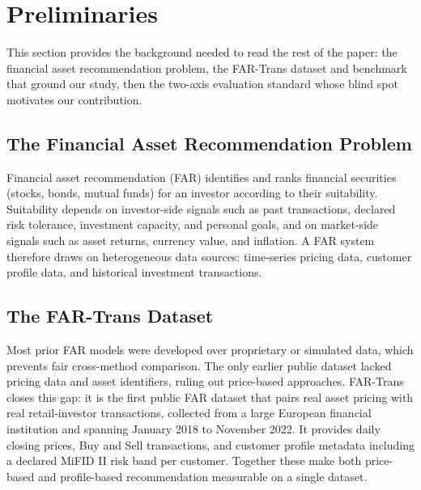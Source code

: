 \section{Preliminaries}
\label{sec:prelim}

This section provides the background needed to read the rest of the paper: the financial asset recommendation problem, the FAR-Trans dataset and benchmark that ground our study, then the two-axis evaluation standard whose blind spot motivates our contribution.

\subsection{The Financial Asset Recommendation Problem}
Financial asset recommendation (FAR) identifies and ranks financial securities (stocks, bonds, mutual funds) for an investor according to their suitability. Suitability depends on investor-side signals such as past transactions, declared risk tolerance, investment capacity, and personal goals, and on market-side signals such as asset returns, currency value, and inflation. A FAR system therefore draws on heterogeneous data sources: time-series pricing data, customer profile data, and historical investment transactions.

\subsection{The FAR-Trans Dataset}
Most prior FAR models were developed over proprietary or simulated data, which prevents fair cross-method comparison. The only earlier public dataset lacked pricing data and asset identifiers, ruling out price-based approaches. FAR-Trans~\cite{sanzcruzado2024fartransinvestmentdatasetfinancial} closes this gap: it is the first public FAR dataset that pairs real asset pricing with real retail-investor transactions, collected from a large European financial institution and spanning January 2018 to November 2022. It provides daily closing prices, Buy and Sell transactions, and customer profile metadata including a declared MiFID II risk band per customer. Together these make both price-based and profile-based recommendation measurable on a single dataset.

